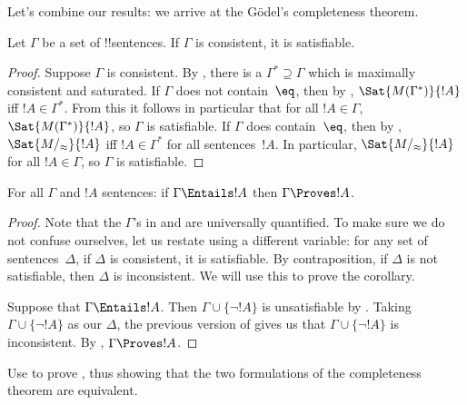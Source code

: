 \documentclass[../../../include/open-logic-section]{subfiles}
\begin{document}

Let's combine our results: we arrive at the G\"odel's completeness theorem.

\begin{thm}
Let $\Gamma$ be a set of !!{sentence}s.  If
$\Gamma$ is consistent, it is satisfiable.
\end{thm}

\begin{proof}
Suppose $\Gamma$ is consistent.  By , there
is a $\Gamma^* \supseteq \Gamma$ which is maximally consistent and
saturated.  If $\Gamma$ does not contain~$\eq$, then by
, $\Sat{M(\Gamma^*)}{!A}$ iff $!A \in \Gamma^*$.
From this it follows in particular that for all $!A \in \Gamma$,
$\Sat{M(\Gamma^*)}{!A}$, so $\Gamma$ is satisfiable.  If $\Gamma$ does
contain~$\eq$, then by , $\Sat{M/_\approx}{!A}$
iff $!A \in \Gamma^*$ for all sentences~$!A$.  In particular,
$\Sat{M/_\approx}{!A}$ for all $!A \in \Gamma$, so $\Gamma$ is
satisfiable.
\end{proof}

\begin{cor}
For all $\Gamma$ and $!A$ sentences: if $\Gamma \Entails !A$ then
$\Gamma \Proves !A$.
\end{cor}

\begin{proof}
Note that the $\Gamma$'s in  and
 are universally quantified.  To make sure we
do not confuse ourselves, let us restate 
using a different variable: for any set of sentences~$\Delta$, if
$\Delta$ is consistent, it is satisfiable.  By contraposition, if
$\Delta$ is not satisfiable, then $\Delta$ is inconsistent.  We will
use this to prove the corollary.

Suppose that $\Gamma \Entails !A$.  Then $\Gamma \cup \{\lnot !A\}$ is
unsatisfiable by .  Taking $\Gamma
\cup \{\lnot !A\}$ as our $\Delta$, the previous version of
 gives us that $\Gamma \cup \{\lnot !A\}$ is
inconsistent.  By
,
$\Gamma \Proves !A$.
\end{proof}

\begin{prob}
Use  to prove
, thus showing that the two
formulations of the completeness theorem are equivalent.
\end{prob}
\end{document}
